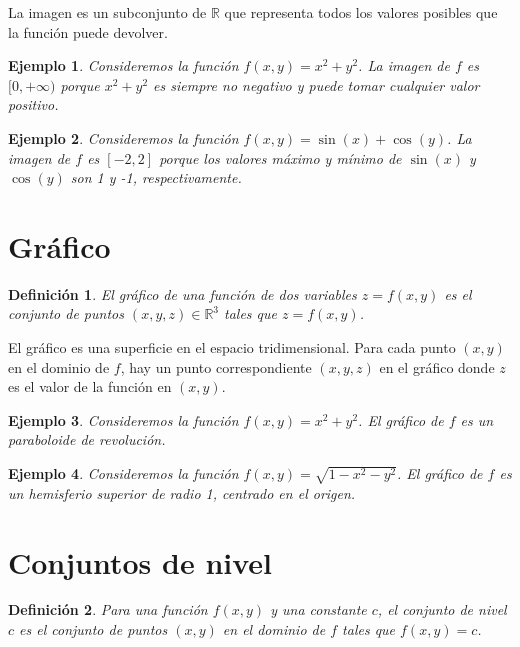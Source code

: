 \documentclass[11pt]{book}
\theoremstyle{definicion}
\theoremstyle{teorema}
\theoremstyle{ejemplo}
\newtheorem{definition}{Definición}
\newtheorem{example}{Ejemplo}
\begin{document}
La imagen es un subconjunto de \(\mathbb{R}\) que representa todos los valores posibles que la función puede devolver.

\begin{example}
Consideremos la función \( f(x, y) = x^2 + y^2 \). La imagen de \( f \) es \([0, +\infty)\) porque \(x^2 + y^2\) es siempre no negativo y puede tomar cualquier valor positivo.
\end{example}

\begin{example}
Consideremos la función \( f(x, y) = \sin(x) + \cos(y) \). La imagen de \( f \) es \([-2, 2]\) porque los valores máximo y mínimo de \(\sin(x)\) y \(\cos(y)\) son 1 y -1, respectivamente.
\end{example}

\section{Gráfico}
\begin{definition}
El gráfico de una función de dos variables \( z = f(x, y) \) es el conjunto de puntos \((x, y, z) \in \mathbb{R}^3\) tales que \( z = f(x, y) \).
\end{definition}

El gráfico es una superficie en el espacio tridimensional. Para cada punto \((x, y)\) en el dominio de \(f\), hay un punto correspondiente \((x, y, z)\) en el gráfico donde \(z\) es el valor de la función en \((x, y)\).

\begin{example}
Consideremos la función \( f(x, y) = x^2 + y^2 \). El gráfico de \( f \) es un paraboloide de revolución.
\end{example}

\begin{example}
Consideremos la función \( f(x, y) = \sqrt{1 - x^2 - y^2} \). El gráfico de \( f \) es un hemisferio superior de radio 1, centrado en el origen.
\end{example}

\section{Conjuntos de nivel}
\begin{definition}
Para una función \( f(x, y) \) y una constante \( c \), el conjunto de nivel \( c \) es el conjunto de puntos \((x, y)\) en el dominio de \(f\) tales que \( f(x, y) = c \).
\end{definition}
\end{document}
